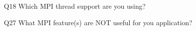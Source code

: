 \begin{description}%
\item{Q18} Which MPI thread support are you using?%
\item{Q27} What MPI feature(s) are NOT useful for you application?%
\end{description}%
